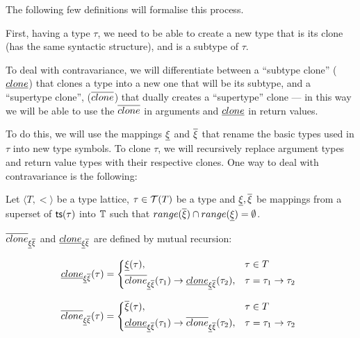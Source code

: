 \documentclass[main.tex]{subfiles}
\begin{document}
The following few definitions will formalise this process.

First, having a type $\tau$, we need to be able to create a new type
that is its clone
(has the same syntactic structure), and is a subtype of $\tau$.

To deal with contravariance, we will differentiate between a ``subtype clone''
($\underline{clone}$)
that clones a type into a new one that will be its subtype, and a
``supertype clone'', ($\overline{clone}$)
that dually creates a ``supertype'' clone --- in this way we will be able to
use the $\overline{clone}$ in arguments and $\underline{clone}$ in return
values.

To do this, we will use the mappings $\underline{\xi}$ and $\overline{\xi}$
that rename the basic types used in $\tau$ into new type symbols. To clone
$\tau$, we will recursively replace argument types and return value types
with their respective clones. One way to deal with contravariance is the following:

\newcommand\clonesub{\subtyper{clone}_{\subtyper{\xi} \suptyper{\xi}}}
\newcommand\clonesup{\suptyper{clone}_{\subtyper{\xi} \suptyper{\xi}}}

\begin{defn}
    Let $\langle T, \less \rangle$ be a type lattice, $\tau \in \mathcal{T}( T )$
    be a type and $\underline{\xi}, \overline{\xi}$ be mappings from a
    superset of
    $\mathsf{ts}(\tau)$ into $\mathbb{T}$ such that
    $range(\overline{\xi}) \cap range(\underline{\xi}) = \emptyset$.

    $\overline{clone}_{\underline{\xi} \overline{\xi}}$ and
    $\underline{clone}_{\underline{\xi} \overline{\xi}}$ are defined by
    mutual recursion:

    \[
        \subtyper{clone}_{\subtyper{\xi} \suptyper{\xi}}(\tau) =
        \begin{cases*}
            \subtyper{\xi}(\tau) ,&
                $\tau \in T$ \\
            \suptyper{clone}_{\subtyper{\xi} \suptyper{\xi}}(\tau_1)
                \tot \subtyper{clone}_{\subtyper{\xi} \suptyper{\xi}}(\tau_2) ,&
                $\tau = \tau_1 \tot \tau_2$ \\
        \end{cases*}
    \]

    \[
        \suptyper{clone}_{\subtyper{\xi} \suptyper{\xi}}(\tau) =
        \begin{cases*}
            \suptyper{\xi}(\tau) ,&
                $\tau \in T$ \\
            \subtyper{clone}_{\subtyper{\xi} \suptyper{\xi}}(\tau_1)
                \tot \suptyper{clone}_{\subtyper{\xi} \suptyper{\xi}}(\tau_2) ,&
                $\tau = \tau_1 \tot \tau_2$ \\
        \end{cases*}
    \]

\end{defn}
\end{document}
